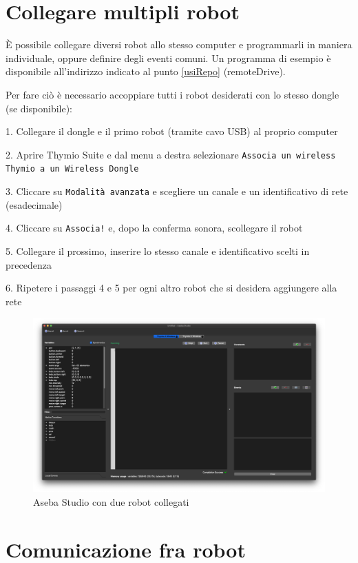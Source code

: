\documentclass[12pt]{article}
\begin{document}
\section{Collegare multipli robot}\label{multi-robot}

È possibile collegare diversi robot allo stesso computer e programmarli in maniera individuale, oppure definire degli eventi comuni. Un programma di esempio è disponibile all'indirizzo indicato al punto \ref{usiRepo} (remoteDrive).

Per fare ciò è necessario accoppiare tutti i robot desiderati con lo stesso dongle (se disponibile):

1. Collegare il dongle e il primo robot (tramite cavo USB) al proprio computer

2. Aprire Thymio Suite e dal menu a destra selezionare \texttt{Associa un wireless Thymio a un Wireless Dongle}

3. Cliccare su \texttt{Modalità avanzata} e scegliere un canale e un identificativo di rete (esadecimale)

4. Cliccare su \texttt{Associa!} e, dopo la conferma sonora, scollegare il robot

5. Collegare il prossimo, inserire lo stesso canale e identificativo scelti in precedenza

6. Ripetere i passaggi 4 e 5 per ogni altro robot che si desidera aggiungere alla rete


\begin{figure}[H]
	\includegraphics[width=\textwidth]{img/multiRobot.png}
	\caption{Aseba Studio con due robot collegati}
	\label{multiRobot}
\end{figure}

\newpage


\section{Comunicazione fra robot}\label{network}
\end{document}
